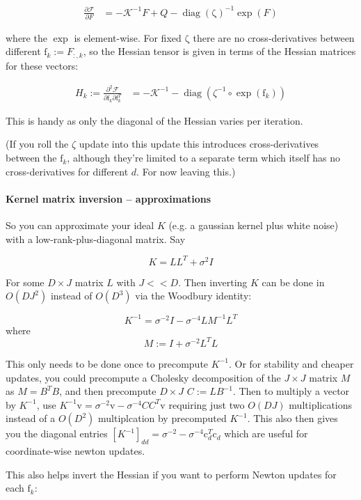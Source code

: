 \documentclass{report}
\DeclareMathOperator{\diag}{diag}
\renewcommand{\v}[1]{\boldsymbol{\mathrm{#1}}}
\begin{document}
\begin{align*}
\frac{\partial \mathcal{F}}{\partial F} &= -\mathcal{K}^{-1}F + Q -
\diag(\v{\zeta})^{-1} \exp(F)
\end{align*}

where the $\exp$ is element-wise. For fixed
$\v\zeta$ there are no cross-derivatives between different $\v{f}_k :=
F_{:,k}$, so the Hessian tensor is given in terms of the Hessian
matrices for these vectors:

\begin{align*}
H_k := \frac{\partial^2 \mathcal{F}}{\partial \v{f}_k \partial \v{f}_k^T} &=
-\mathcal{K}^{-1} - \diag(\zeta^{-1} \circ \exp(\v{f}_{k}))
\end{align*}

This is handy as only the diagonal of the Hessian varies per
iteration.

(If you roll the $\zeta$ update into this update this introduces
cross-derivatives between the $\v{f}_k$, although they're limited to a
separate term which itself has no cross-derivatives for different $d$.
For now leaving this.)

\paragraph{Kernel matrix inversion -- approximations}

So you can approximate your ideal $K$ (e.g. a gaussian kernel plus
white noise) with a low-rank-plus-diagonal matrix. Say

\[K = LL^T + \sigma^2 I\]

For some $D\times J$ matrix $L$ with $J << D$. Then inverting $K$ can
be done in $O(DJ^2)$ instead of $O(D^3)$ via the Woodbury identity:

\[K^{-1} = \sigma^{-2}I - \sigma^{-4}LM^{-1}L^T\]
where
\[ M := I + \sigma^{-2}L^TL \]

This only needs to be done once to precompute $K^{-1}$. Or for
stability and cheaper updates, you could precompute a Cholesky
decomposition of the $J\times J$ matrix $M$ as $M = B^TB$, and then precompute $D
\times J$ $C := LB^{-1}$. Then to multiply a vector by $K^{-1}$, use $K^{-1}\v{v} = \sigma^{-2}\v{v}
- \sigma^{-4}CC^T\v{v}$ requiring just two $O(DJ)$ multiplications instead of a $O(D^2)$
multiplcation by precomputed $K^{-1}$. This also then gives you the
diagonal entries $[K^{-1}]_{dd} = \sigma^{-2} -
\sigma^{-4}\v{c}_d^T\v{c}_d$ which are useful for coordinate-wise
newton updates.

This also helps invert the Hessian if you want to perform
Newton updates for each $\v{f}_k$:
\end{document}
